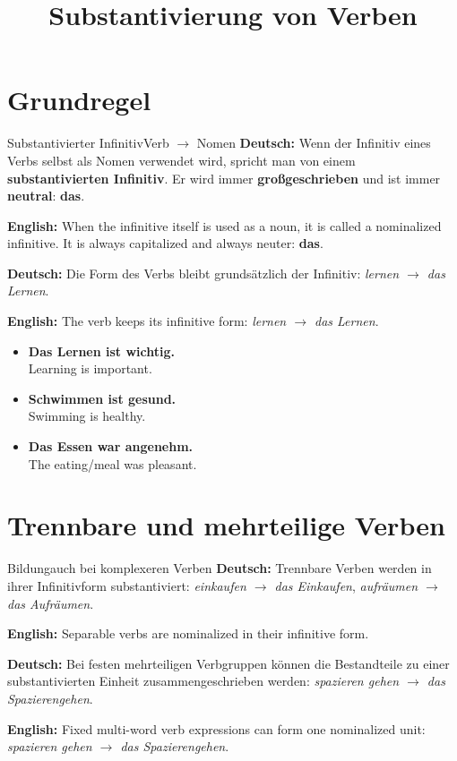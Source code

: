 \documentclass[a4paper,11pt]{article}
\title{Substantivierung von Verben}
\date{}
\newcommand{\GermanText}[1]{\textbf{Deutsch: }#1\par}
\newcommand{\EnglishText}[1]{{\small\color{SoftGray}\textbf{English: }#1\par}}
\newcommand{\ExampleItem}[2]{\item \textbf{#1}\\{\small\color{SoftGray}#2}}
\begin{document}
\begin{preview}
\maketitle

\section{Grundregel}
\begin{grammarentry}{Substantivierter Infinitiv}{Verb $\rightarrow$ Nomen}
\GermanText{Wenn der Infinitiv eines Verbs selbst als Nomen verwendet wird, spricht man von einem \textbf{substantivierten Infinitiv}. Er wird immer \textbf{großgeschrieben} und ist immer \textbf{neutral}: \textbf{das}.}
\EnglishText{When the infinitive itself is used as a noun, it is called a nominalized infinitive. It is always capitalized and always neuter: \textbf{das}.}
\GermanText{Die Form des Verbs bleibt grundsätzlich der Infinitiv: \textit{lernen $\rightarrow$ das Lernen}.}
\EnglishText{The verb keeps its infinitive form: \textit{lernen $\rightarrow$ das Lernen}.}
\end{grammarentry}
\begin{exbox}\begin{itemize}
\ExampleItem{Das Lernen ist wichtig.}{Learning is important.}
\ExampleItem{Schwimmen ist gesund.}{Swimming is healthy.}
\ExampleItem{Das Essen war angenehm.}{The eating/meal was pleasant.}
\end{itemize}\end{exbox}

\section{Trennbare und mehrteilige Verben}
\begin{grammarentry}{Bildung}{auch bei komplexeren Verben}
\GermanText{Trennbare Verben werden in ihrer Infinitivform substantiviert: \textit{einkaufen $\rightarrow$ das Einkaufen}, \textit{aufräumen $\rightarrow$ das Aufräumen}.}
\EnglishText{Separable verbs are nominalized in their infinitive form.}
\GermanText{Bei festen mehrteiligen Verbgruppen können die Bestandteile zu einer substantivierten Einheit zusammengeschrieben werden: \textit{spazieren gehen $\rightarrow$ das Spazierengehen}.}
\EnglishText{Fixed multi-word verb expressions can form one nominalized unit: \textit{spazieren gehen $\rightarrow$ das Spazierengehen}.}
\end{grammarentry}


\end{preview}
\end{document}
